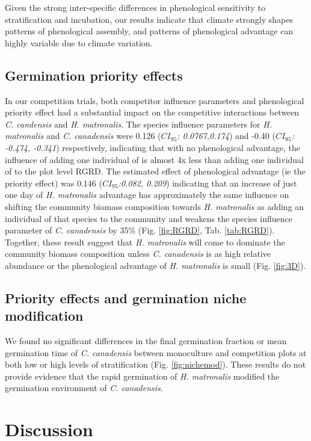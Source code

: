 \documentclass{article}\usepackage[]{graphicx}\usepackage[]{color}
\begin{document}
{Given the strong inter-specific differences in phenological sensitivity to stratification and incubation, our results indicate that climate strongly shapes patterns of phenological assembly, and patterns of phenological advantage can highly variable due to climate variation.

\subsection*{Germination priority effects}
In our competition trials, both competitor influence parameters and phenological priority effect had a substantial impact on the competitive interactions between \textit{C. candensis} and \textit{H. matronalis}. The species influence parameters for \textit{H. matronalis} and \textit{C. canadensis} were 0.126 (\textit{$CI_{95}$: 0.0767,0.174}) and -0.40 (\textit{$CI_{95}$: -0.474, -0.341}) respectively, indicating that with no phenological advantage, the influence of adding one individual of  is almost 4x less than adding one individual of  to the plot level RGRD. The estimated effect of phenological advantage (ie the priority effect) was 0.146 (\textit{$CI_{95}$:0.082,  0.209}) indicating that an increase of just one day of \textit{H. matronalis} advantage has approximately the same influence on shifting the community biomass composition towards \textit{H. matronalis} as adding an individual of that species to the community and weakens the species influence parameter of \textit{C. canadensis} by 35\% (Fig. \ref{fig:RGRD}, Tab. \ref{tab:RGRD}). Together, these result suggest that \textit{H. matronalis} will come to dominate the community biomass composition unless \textit{C. canadensis} is as high relative abundance or the phenological advantage of \textit{H. matronalis} is small (Fig. \ref{fig:3D}).

\subsection*{Priority effects and germination niche modification}
We found no significant differences in the final germination fraction or mean germination time of \textit {C. canadensis} between monoculture and competition plots at both low or high levels of stratification (Fig. \ref{fig:nichemod}). These results do not provide evidence that the rapid germination of \textit{H. matronalis} modified the germination environment of \textit{C. canadensis}. 

\section*{Discussion}

}
\end{document}

